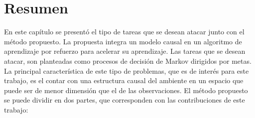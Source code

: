  
 
 
 \clearpage
 \section{Resumen}
 
En este capítulo se presentó el tipo de tareas que se 
desean atacar junto con el método propuesto. La propuesta
integra un modelo causal en un algoritmo de aprendizaje por refuerzo para
acelerar su aprendizaje.
Las tareas que se desean atacar, son 
planteadas como procesos de decisión de Markov dirigidos por metas.
La principal característica de este tipo de problemas, que es de interés para este trabajo,
es el contar con una estructura causal del ambiente en un espacio 
que puede ser de menor dimensión que el de las observaciones.
El método propuesto se puede dividir en dos partes, que
corresponden con las contribuciones de este trabajo:

